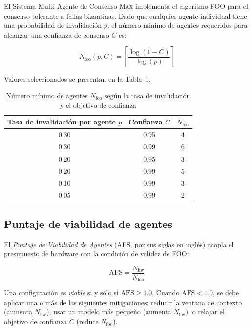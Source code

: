 El Sistema Multi-Agente de Consenso \textsc{Max} implementa el algoritmo
FOO para el consenso tolerante a fallas bizantinas. Dado que cualquier
agente individual tiene una probabilidad de invalidación $p$, el número
mínimo de agentes requeridos para alcanzar una confianza de consenso $C$ es:

\begin{equation}
N_{\text{foo}}(p, C)
  = \left\lceil \frac{\log(1 - C)}{\log(p)} \right\rceil
\label{eq:nfoo}
\end{equation}

Valores seleccionados se presentan en la Tabla~\ref{tab:nfoo}.

\begin{table}[h]
\centering
\caption{Número mínimo de agentes $N_{\text{foo}}$ según la tasa de invalidación
y el objetivo de confianza}
\label{tab:nfoo}
\begin{tabular}{ccc}
\toprule
Tasa de invalidación por agente $p$ & Confianza $C$ & $N_{\text{foo}}$ \\
\midrule
0.30 & 0.95 & 4 \\
0.30 & 0.99 & 6 \\
0.20 & 0.95 & 3 \\
0.20 & 0.99 & 5 \\
0.10 & 0.99 & 3 \\
0.05 & 0.99 & 2 \\
\bottomrule
\end{tabular}
\end{table}

\subsection{Puntaje de viabilidad de agentes}

El \emph{Puntaje de Viabilidad de Agentes} (AFS, por sus siglas en inglés)
acopla el presupuesto de hardware con la condición de validez de FOO:

\begin{equation}
\text{AFS} = \frac{N_{\text{hw}}}{N_{\text{foo}}}
\label{eq:afs}
\end{equation}

Una configuración es \emph{viable} si y sólo si $\text{AFS} \geq 1.0$.
Cuando $\text{AFS} < 1.0$, se debe aplicar una o más de las siguientes
mitigaciones: reducir la ventana de contexto (aumenta $N_{\text{hw}}$),
usar un modelo más pequeño (aumenta $N_{\text{hw}}$), o relajar el
objetivo de confianza $C$ (reduce $N_{\text{foo}}$).

